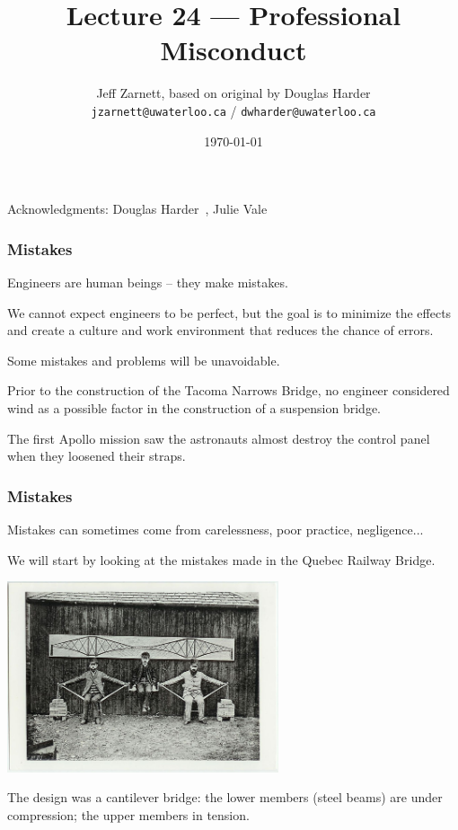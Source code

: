 

\title{Lecture 24 --- Professional Misconduct }

\author{Jeff Zarnett, based on original by Douglas Harder \\ \small \texttt{jzarnett@uwaterloo.ca} / \texttt{dwharder@uwaterloo.ca}}
\date{\today}




\begin{frame}
  \titlepage

\begin{center}
  \small{Acknowledgments: Douglas Harder~\cite{dwh}, Julie Vale~\cite{jv}}
  \end{center}
\end{frame}



\begin{frame}
\frametitle{Mistakes}

Engineers are human beings -- they make mistakes.

We cannot expect engineers to be perfect, but the goal is to minimize the effects and create a culture and work environment that reduces the chance of errors.

Some mistakes and problems will be unavoidable.

Prior to the construction of the Tacoma Narrows Bridge, no engineer considered wind as a possible factor in the construction of a suspension bridge.

The first Apollo mission saw the astronauts almost destroy the control panel when they loosened their straps.

\end{frame}



\begin{frame}
\frametitle{Mistakes}

Mistakes can sometimes come from carelessness, poor practice, negligence...

We will start by looking at the mistakes made in the Quebec Railway Bridge.

\begin{center}
 \includegraphics[width=0.6\textwidth]{images/suspension-bridge-principle}
\end{center}

The design was a cantilever bridge: the lower members (steel beams) are under compression; the upper members in tension.

\end{frame}



